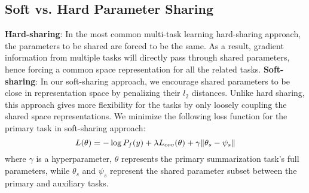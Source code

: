 \documentclass[11pt,a4paper]{article}
\begin{document}
\subsection{Soft vs. Hard Parameter Sharing}
\label{subsec:soft-vs-hard}

\noindent\textbf{Hard-sharing}: In the most common multi-task learning hard-sharing approach, the parameters to be shared are forced to be the same. As a result, gradient information from multiple tasks will directly pass through shared parameters, hence forcing a common space representation for all the related tasks.
\noindent\textbf{Soft-sharing}:
In our soft-sharing approach, we encourage shared parameters to be close in representation space by penalizing their $l_2$ distances. Unlike hard sharing, this approach gives more flexibility for the tasks by only loosely coupling the shared space representations. We minimize the following loss function for the primary task in soft-sharing approach:
\vspace{-5pt}
\begin{equation} \label{eq:p_f_mtl}
L(\theta) = - \log P_f(y) + \lambda L_{cov}(\theta) + \gamma \| \theta_{s} - \psi_{s} \|
\vspace{-5pt}
\end{equation}
where $\gamma$ is a hyperparameter, $\theta$ represents the primary summarization task's full parameters, while $\theta_{s}$ and $\psi_{s}$ represent the shared parameter subset between the primary and auxiliary tasks. 
\end{document}
